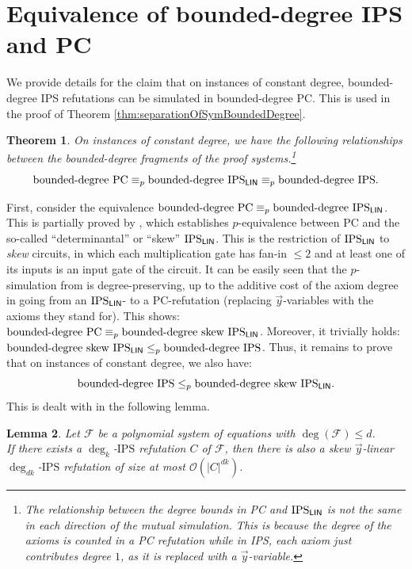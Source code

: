 \documentclass[10pt,a4paper]{article}
\newtheorem{theorem}{Theorem}
\newtheorem{lemma}[theorem]{Lemma}
\newcommand{\IPS}{\mathrm{IPS}}
\newcommand{\BigO}{\ensuremath{\mathcal{O}}}
\newcommand{\Circ}{C} %
\newcommand{\F}{\ensuremath{\mathcal{F}}}
\newcommand{\IPSlin}{\text{\upshape IPS}_{\mathsf{LIN}}}
\begin{document}
\section{Equivalence of bounded-degree IPS and PC}
We provide details for the claim that on instances of constant degree, bounded-degree IPS refutations can be simulated in bounded-degree PC. This is used in the proof of Theorem \ref{thm:separationOfSymBoundedDegree}.
\begin{theorem}
	\label{thm:simulationsOfAlgebraicSystemsInIPSconstantDegree}
	On instances of \emph{constant degree}, we have the following relationships between the bounded-degree fragments of the proof systems.\footnote{The relationship between the degree bounds in PC and $\IPSlin$ is not the same in each direction of the mutual simulation. This is because the degree of the axioms is counted in a PC refutation while in IPS, each axiom just contributes degree $1$, as it is replaced with a $\vec y$-variable.}    
	\[
	\text{bounded-degree }\mathrm{PC} \equiv_p \text{bounded-degree }\IPSlin \equiv_p \text{bounded-degree } \IPS.
	\]
\end{theorem}
First, consider the equivalence $\text{bounded-degree }\mathrm{PC} \equiv_p \text{bounded-degree }\IPSlin$. 
This is partially proved by \cite[Proposition 3.4]{IPS}, which establishes $p$-equivalence between PC and the so-called ``determinantal'' or ``skew'' $\IPSlin$. This is the restriction of $\IPSlin$ to \emph{skew} circuits, in which each multiplication gate has fan-in $\leq 2$ and at least one of its inputs is an input gate of the circuit.
It can be easily seen that the $p$-simulation from \cite[Proposition 3.4]{IPS} is degree-preserving, up to the additive cost of the axiom degree in going from an $\IPSlin$- to a PC-refutation (replacing $\vec y$-variables with the axioms they stand for). This shows: $\text{bounded-degree }\mathrm{PC} \equiv_p \text{bounded-degree skew  }\IPSlin$. Moreover, it trivially holds: $\text{bounded-degree skew }\IPSlin \leq_p \text{bounded-degree } \IPS$. 
Thus, it remains to prove that on instances of constant degree, we also have: 
\[
\text{bounded-degree } \IPS \leq_p \text{bounded-degree skew }\IPSlin.
\]
This is dealt with in the following lemma.
\begin{lemma}
	\label{lem:constantDegreeAllowsSkewisation}
	Let $\F$ be a polynomial system of equations with $\deg(\F) \leq d$.\\ 
	If there exists a $\deg_k$-$\IPS$ refutation $C$ of $\F$, then there is also a skew $\vec y$-linear $\deg_{dk}$-$\IPS$ refutation of size at most $\BigO(|\Circ|^{dk})$.
\end{lemma}
\end{document}
